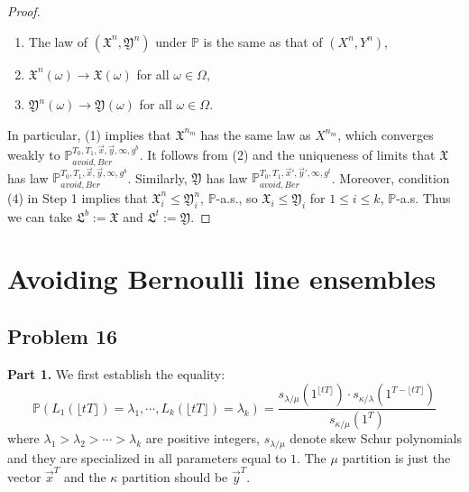 \documentclass[12pt]{article}
\begin{document}
\begin{proof}
\begin{enumerate}[label=(\arabic*)]
		\item The law of $(\mathfrak{X}^n,\mathfrak{Y}^n)$ under $\mathbb{P}$ is the same as that of $(X^n,Y^n)$,
		
		\item $\mathfrak{X}^n(\omega) \longrightarrow \mathfrak{X}(\omega)$ for all $\omega\in\Omega$,
		
		\item $\mathfrak{Y}^n(\omega) \longrightarrow \mathfrak{Y}(\omega)$ for all $\omega\in\Omega$.
		
	\end{enumerate}

	In particular, (1) implies that $\mathfrak{X}^{n_m}$ has the same law as $X^{n_m}$, which converges weakly to $\mathbb{P}_{avoid,Ber}^{T_0,T_1,\vec{x},\vec{y},\infty,g^b}$. It follows from (2) and the uniqueness of limits that $\mathfrak{X}$ has law $\mathbb{P}_{avoid,Ber}^{T_0,T_1,\vec{x},\vec{y},\infty,g^b}$. Similarly, $\mathfrak{Y}$ has law $\mathbb{P}_{avoid,Ber}^{T_0,T_1,\vec{x}',\vec{y}',\infty,g^t}$. Moreover, condition (4) in Step 1 implies that $\mathfrak{X}^n_i \leq \mathfrak{Y}^n_i$, $\mathbb{P}$-a.s., so $\mathfrak{X}_i \leq \mathfrak{Y}_i$ for $1\leq i\leq k$, $\mathbb{P}$-a.s. Thus we can take $\mathfrak{L}^b := \mathfrak{X}$ and $\mathfrak{L}^t := \mathfrak{Y}$.
	
	\end{proof}


\section{Avoiding Bernoulli line ensembles}

								\subsection*{Problem 16}
\textbf{Part 1. }We first establish the equality:
$$\mathbb{P}(L_{1}(\lfloor tT \rfloor) = \lambda_{1}, \cdots, L_{k}(\lfloor tT \rfloor) = \lambda_{k})=\frac{s_{\lambda/\mu}(1^{\lfloor tT \rfloor})\cdot s_{\kappa/\lambda}(1^{T-\lfloor tT \rfloor})}{s_{\kappa/\mu}(1^{T})}$$ where $\lambda_{1}>\lambda_{2}>\cdots >\lambda_{k}$ are positive integers, $s_{\lambda/\mu}$ denote skew Schur polynomials and they are specialized in all parameters equal to $1$. The $\mu$ partition is just the vector $\vec{x}^{T}$ and the $\kappa$ partition should be $\vec{y}^{T}$.
\end{document}
